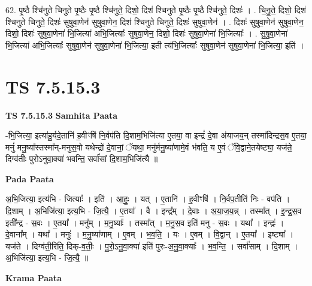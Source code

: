 \documentclass[17pt]{extarticle}
\begin{document}
62. पृ॒ष्ठै श्चि॑नुते चिनुते पृ॒ष्ठैः पृ॒ष्ठै श्चि॑नुते॒ दिशो॒ दिश॑ श्चिनुते पृ॒ष्ठैः पृ॒ष्ठै श्चि॑नुते॒ दिशः॑ । . चि॒नु॒ते॒ दिशो॒ दिश॑ श्चिनुते चिनुते॒ दिशः॑ सुषुवा॒णेन॑ सुषुवा॒णेन॒ दिश॑ श्चिनुते चिनुते॒ दिशः॑ सुषुवा॒णेन॑ । . दिशः॑ सुषुवा॒णेन॑ सुषुवा॒णेन॒ दिशो॒ दिशः॑ सुषुवा॒णेना॑ भि॒जित्या॑ अभि॒जित्याः᳚ सुषुवा॒णेन॒ दिशो॒ दिशः॑ सुषुवा॒णेना॑ भि॒जित्याः᳚ । . सु॒षु॒वा॒णेना॑ भि॒जित्या॑ अभि॒जित्याः᳚ सुषुवा॒णेन॑ सुषुवा॒णेना॑ भि॒जित्या॒ इती त्य॑भि॒जित्याः᳚ सुषुवा॒णेन॑ सुषुवा॒णेना॑ भि॒जित्या॒ इति॑ । \newline
\pagebreak
{}

\section{ TS 7.5.15.3 }

\textbf{TS 7.5.15.3 } \newline
\textbf{Samhita Paata} \newline

-भि॒जित्या॒ इत्या॑हु॒र्यदे॒तानि॑ ह॒वीꣳषि॑ नि॒र्वप॑ति दि॒शाम॒भिजि॑त्या ए॒तया॒ वा इन्द्रं॑ दे॒वा अ॑याजय॒न् तस्मा॑दिन्द्रस॒व ए॒तया॒ मनुं॑ मनु॒ष्या᳚स्तस्मा᳚न्-मनुस॒वो यथेन्द्रो॑ दे॒वानां॒ ॅयथा॒ मनु॑र्मनु॒ष्या॑णामे॒वं भ॑वति॒ य ए॒वं ॅवि॒द्वाने॒तयेष्ट्या॒ यज॑ते॒ दिग्व॑तीः पुरोऽनुवा॒क्या॑ भवन्ति॒ सर्वा॑सां दि॒शाम॒भिजि॑त्यै ॥ \newline

\textbf{Pada Paata} \newline

अ॒भि॒जित्या॒ इत्य॑भि - जित्याः᳚ । इति॑ । आ॒हुः॒ । यत् । ए॒तानि॑ । ह॒वीꣳषि॑ । नि॒र्वप॒तीति॑ निः - वप॑ति । दि॒शाम् । अ॒भिजि॑त्या॒ इत्य॒भि - जि॒त्यै॒ । ए॒तया᳚ । वै । इन्द्र᳚म् । दे॒वाः । अ॒या॒ज॒य॒न्न् । तस्मा᳚त् । इ॒न्द्र॒स॒व इती᳚न्द्र - स॒वः । ए॒तया᳚ । मनु᳚म् । म॒नु॒ष्याः᳚ । तस्मा᳚त् । म॒नु॒स॒व इति॑ मनु - स॒वः । यथा᳚ । इन्द्रः॑ । दे॒वाना᳚म् । यथा᳚ । मनुः॑ । म॒नु॒ष्या॑णाम् । ए॒वम् । भ॒व॒ति॒ । यः । ए॒वम् । वि॒द्वान् । ए॒तया᳚ । इष्ट्या᳚ । यज॑ते । दिग्व॑ती॒रिति॒ दिक्-व॒तीः॒ । पु॒रो॒ऽनु॒वा॒क्या॑ इति॑ पुरः-अ॒नु॒वा॒क्याः᳚ । भ॒व॒न्ति॒ । सर्वा॑साम् । दि॒शाम् । अ॒भिजि॑त्या॒ इत्य॒भि - जि॒त्यै॒ ॥  \newline


\textbf{Krama Paata} \newline
\end{document}
